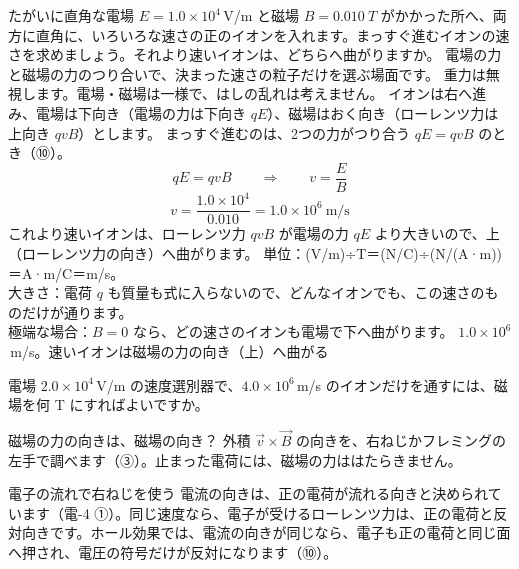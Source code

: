 \label{ph:電-6:ex13}
\begin{phreidai}
たがいに直角な電場 $E=1.0\times10^4$\,V/m と磁場 $B=\qty{0.010}{T}$ がかかった所へ、両方に直角に、いろいろな速さの正のイオンを入れます。まっすぐ進むイオンの速さを求めましょう。それより速いイオンは、どちらへ曲がりますか。
\phbamen
電場の力と磁場の力のつり合いで、決まった速さの粒子だけを選ぶ場面です。
\phmushi
重力は無視します。電場・磁場は一様で、はしの乱れは考えません。
\phzu
イオンは右へ進み、電場は下向き（電場の力は下向き $qE$）、磁場はおく向き（ローレンツ力は上向き $qvB$）とします。
\phriyu
まっすぐ進むのは、2つの力がつり合う $qE=qvB$ のとき（⑩）。
\phtateru
\[qE=qvB\qquad\Longrightarrow\qquad v=\frac{E}{B}\]
\phtoku
\[v=\frac{1.0\times10^4}{0.010}=1.0\times10^6\ \text{m/s}\]
これより速いイオンは、ローレンツ力 $qvB$ が電場の力 $qE$ より大きいので、上（ローレンツ力の向き）へ曲がります。
\phtashikame
単位：(V/m)÷T＝(N/C)÷(N/(A·m))＝A·m/C＝m/s。\\
大きさ：電荷 $q$ も質量も式に入らないので、どんなイオンでも、この速さのものだけが通ります。\\
極端な場合：$B=0$ なら、どの速さのイオンも電場で下へ曲がります。
\kotae $1.0\times10^6$\,m/s。速いイオンは磁場の力の向き（上）へ曲がる
\end{phreidai}
\begin{jibun}
電場 $2.0\times10^4$\,V/m の速度選別器で、$4.0\times10^6$\,m/s のイオンだけを通すには、磁場を何 T にすればよいですか。
\end{jibun}

\begin{tsumazuki}{磁場の力の向きは、磁場の向き？}
外積 $\vec v\times\vec B$ の向きを、右ねじかフレミングの左手で調べます（③）。止まった電荷には、磁場の力ははたらきません。
\end{tsumazuki}

\begin{tsumazuki}{電子の流れで右ねじを使う}
電流の向きは、正の電荷が流れる向きと決められています（電-4 ①）。同じ速度なら、電子が受けるローレンツ力は、正の電荷と反対向きです。ホール効果では、電流の向きが同じなら、電子も正の電荷と同じ面へ押され、電圧の符号だけが反対になります（⑩）。
\end{tsumazuki}

